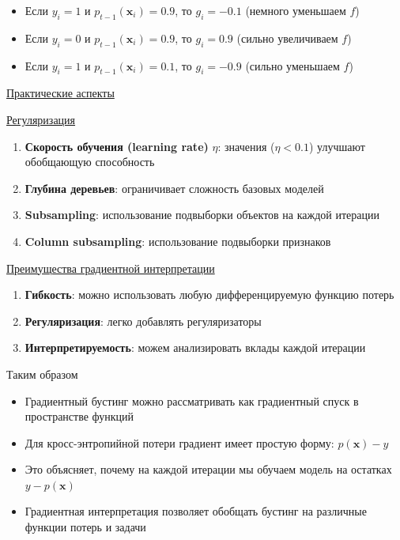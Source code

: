 \begin{itemize}
    \item Если $y_i = 1$ и $p_{t-1}(\bm{x}_i) = 0.9$, то $g_i = -0.1$ (немного уменьшаем $f$)
    \item Если $y_i = 0$ и $p_{t-1}(\bm{x}_i) = 0.9$, то $g_i = 0.9$ (сильно увеличиваем $f$)
    \item Если $y_i = 1$ и $p_{t-1}(\bm{x}_i) = 0.1$, то $g_i = -0.9$ (сильно уменьшаем $f$)
\end{itemize}

\underline{Практические аспекты}

\underline{Регуляризация}

\begin{enumerate}
    \item \textbf{Скорость обучения (learning rate)} $\eta$: значения ($\eta < 0.1$) улучшают обобщающую способность
    \item \textbf{Глубина деревьев}: ограничивает сложность базовых моделей
    \item \textbf{Subsampling}: использование подвыборки объектов на каждой итерации
    \item \textbf{Column subsampling}: использование подвыборки признаков
\end{enumerate}

\underline{Преимущества градиентной интерпретации}

\begin{enumerate}
    \item \textbf{Гибкость}: можно использовать любую дифференцируемую функцию потерь
    \item \textbf{Регуляризация}: легко добавлять регуляризаторы
    \item \textbf{Интерпретируемость}: можем анализировать вклады каждой итерации
\end{enumerate}

Таким образом
\begin{itemize}
    \item Градиентный бустинг можно рассматривать как градиентный спуск в пространстве функций
    \item Для кросс-энтропийной потери градиент имеет простую форму: $p(\bm{x}) - y$
    \item Это объясняет, почему на каждой итерации мы обучаем модель на остатках $y - p(\bm{x})$
    \item Градиентная интерпретация позволяет обобщать бустинг на различные функции потерь и задачи
\end{itemize}

